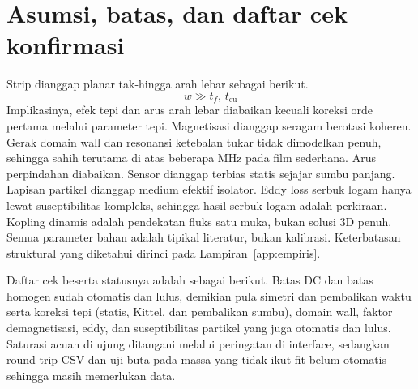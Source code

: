 \documentclass[a4paper,11pt]{article}
\begin{document}
\section{Asumsi, batas, dan daftar cek konfirmasi}
Strip dianggap planar tak-hingga arah lebar sebagai berikut.
\begin{equation*}
w \gg t_{f},\,t_{\mathrm{cu}}
\end{equation*}
Implikasinya, efek tepi dan arus arah lebar diabaikan kecuali koreksi
orde pertama melalui parameter tepi.
Magnetisasi dianggap seragam berotasi koheren.
Gerak domain wall dan resonansi ketebalan tukar tidak dimodelkan
penuh, sehingga sahih terutama di atas beberapa MHz pada film sederhana.
Arus perpindahan diabaikan.
Sensor dianggap terbias statis sejajar sumbu panjang.
Lapisan partikel dianggap medium efektif isolator.
Eddy loss serbuk logam hanya lewat suseptibilitas kompleks,
sehingga hasil serbuk logam adalah perkiraan.
Kopling dinamis adalah pendekatan fluks satu muka, bukan solusi 3D penuh.
Semua parameter bahan adalah tipikal literatur, bukan kalibrasi.
Keterbatasan struktural yang diketahui dirinci pada Lampiran~\ref{app:empiris}.

Daftar cek beserta statusnya adalah sebagai berikut. Batas DC dan batas
homogen sudah otomatis dan lulus, demikian pula simetri dan pembalikan
waktu serta koreksi tepi (statis, Kittel, dan pembalikan sumbu), domain wall, faktor demagnetisasi, eddy, dan
suseptibilitas partikel yang juga otomatis dan lulus. Saturasi acuan di
ujung ditangani melalui peringatan di interface, sedangkan round-trip CSV
dan uji buta pada massa yang tidak ikut fit belum otomatis sehingga masih
memerlukan data.
\end{document}
